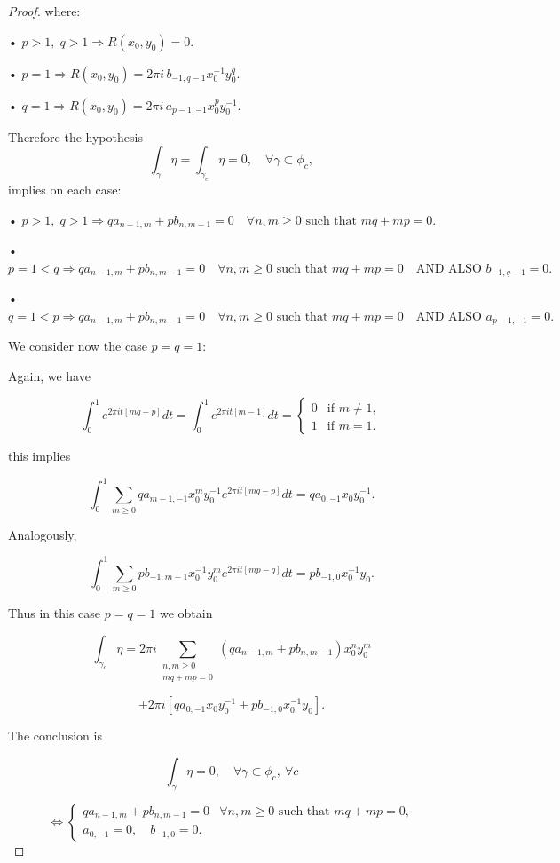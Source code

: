 \documentclass[11pt,a4paper]{amsart}
\theoremstyle{definition}
\begin{document}
\begin{proof}
where:

• $p>1,\; q>1 \Rightarrow R(x_0,y_0)=0.$

• $p=1 \Rightarrow
R(x_0,y_0)=2\pi i\, b_{-1,q-1} x_0^{-1} y_0^q.$

• $q=1 \Rightarrow
R(x_0,y_0)=2\pi i\, a_{p-1,-1} x_0^p y_0^{-1}.$


Therefore the hypothesis
\[
\int_\gamma \eta=\int_{\gamma_c}\eta=0,
\quad \forall\gamma\subset\phi_c,
\]
implies on each case:

• $p>1,\; q>1 \Rightarrow
q a_{n-1,m}+p b_{n,m-1}=0
\quad \forall n,m\ge0 \text{ such that } mq+mp=0.$

• $p=1<q \Rightarrow
q a_{n-1,m}+p b_{n,m-1}=0
\quad \forall n,m\ge0 \text{ such that } mq+mp=0
\quad \text{AND ALSO }
b_{-1,q-1}=0.$

• $q=1<p \Rightarrow
q a_{n-1,m}+p b_{n,m-1}=0
\quad \forall n,m\ge0 \text{ such that } mq+mp=0
\quad \text{AND ALSO }
a_{p-1,-1}=0.$


We consider now the case $p=q=1$:

Again, we have

\[
\int_0^1 e^{2\pi it[mq-p]}dt
=
\int_0^1 e^{2\pi it[m-1]}dt
=
\begin{cases}
0 & \text{if } m\neq1,\\
1 & \text{if } m=1.
\end{cases}
\]

this implies

\[
\int_0^1
\sum_{m\ge0}
q a_{m-1,-1}
x_0^m y_0^{-1}
e^{2\pi it[mq-p]}dt
=
q a_{0,-1} x_0 y_0^{-1}.
\]

Analogously,

\[
\int_0^1
\sum_{m\ge0}
p b_{-1,m-1}
x_0^{-1} y_0^m
e^{2\pi it[mp-q]}dt
=
p b_{-1,0} x_0^{-1} y_0.
\]


Thus in this case $p=q=1$ we obtain

\[
\int_{\gamma_c}\eta
=
2\pi i
\sum_{\substack{n,m\ge0\\ mq+mp=0}}
(q a_{n-1,m}+p b_{n,m-1})
x_0^n y_0^m
\]

\[
+
2\pi i
\left[
q a_{0,-1} x_0 y_0^{-1}
+
p b_{-1,0} x_0^{-1} y_0
\right].
\]

The conclusion is

\[
\int_\gamma\eta=0,
\quad \forall\gamma\subset\phi_c,\ \forall c
\]

\[
\Longleftrightarrow
\begin{cases}
q a_{n-1,m}+p b_{n,m-1}=0
& \forall n,m\ge0 \text{ such that } mq+mp=0,\\[6pt]
a_{0,-1}=0,\quad b_{-1,0}=0.
\end{cases}
\]


\end{proof}
\end{document}
